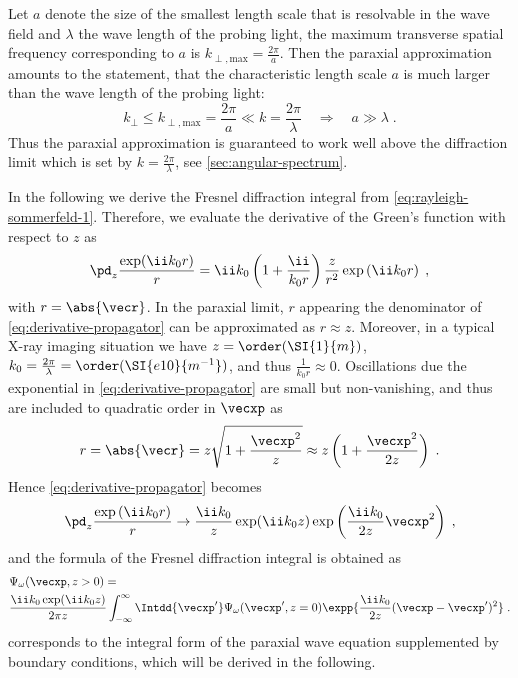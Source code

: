 \documentclass[
twoside,
openright,
titlepage,
numbers=noenddot,
headinclude,
fleqn,
a4paper,
footinclude=true,
cleardoublepage=empty,
abstractoff,
BCOR=5mm,
paper=a4,
fontsize=11pt,
british,ngerman,american,
]{scrreprt}
\begin{document}
Let $a$ denote the size of the smallest length scale that is
resolvable in the wave field and $\lambda$ the wave length of the
probing light, the maximum transverse spatial frequency corresponding
to $a$ is $k_{\perp,\mathrm{max}}=\frac{2\pi}{a}$.  Then the paraxial
approximation amounts to the statement, that the characteristic length
scale $a$ is much larger than the wave length of the probing light:
\begin{equation}
  k_{\perp} \le k_{\perp,\mathrm{max}} = \frac{2\pi}{a} \ll k = 
  \frac{2\pi}{\lambda}
  \quad\Rightarrow\quad a\gg\lambda\;.
\end{equation}
Thus the paraxial approximation is guaranteed to work well above the
diffraction limit which is set by $k=\frac{2\pi}{\lambda}$, see
\cref{sec:angular-spectrum}. %

In the following we derive the Fresnel diffraction integral from
\cref{eq:rayleigh-sommerfeld-1}.  Therefore, we evaluate the
derivative of the Green's function with respect to $z$ as
\begin{equation}
  \label{eq:derivative-propagator}
  \pd_z \frac{\exp(\ii k_0 r)}{r} 
  = \ii k_0\left(1+\frac{\ii}{k_0 r}\right)\frac{z}{r^2}
  \exp\left(\ii k_0 r\right) \;,
\end{equation}
with $r = \abs{\vecr}$.  In the paraxial limit, $r$ appearing the
denominator of \cref{eq:derivative-propagator} can be approximated as
$r\approx z$.  Moreover, in a typical X-ray imaging situation we have
$z = \order(\SI{1}{m})$,
$k_0=\frac{2\pi}{\lambda}=\order(\SI{e10}{m^{-1}})$, and thus
$\frac{1}{k_0 r}\approx 0$.  Oscillations due the exponential in
\cref{eq:derivative-propagator} are small but non-vanishing, and thus
are included to quadratic order in $\vecxp$ as
\begin{equation}
  \label{eq:spherical-parabolic-real}
  r=\abs{\vecr}=z\sqrt{1+\frac{\vecxp^2}{z}} 
  \approx z\left(1+\frac{\vecxp^2}{2z}\right) \;.
\end{equation}
 Hence \cref{eq:derivative-propagator} becomes
\begin{equation}
  \label{eq:fresnel-propagator-limit}
  \pd_z \frac{\exp\left(\ii k_0 r\right)}{r} \to
  \frac{\ii k_0}{z} \exp(\ii k_0 z) 
  \exp\left(\frac{\ii k_0}{2 z} \vecxp^2\right) \;,
\end{equation}
and the formula of the Fresnel diffraction integral is obtained as
\begin{equation}
  \label{eq:fresnel-restored}
  \begin{split}
  &\Psi_\omega(\vecxp,z>0) = 
  \\ & \frac{\ii k_0 \exp(\ii k_0 z)}{2\pi z}
  \int_{-\infty}^{\infty}\Intdd{\vecxp'}
  \Psi_\omega(\vecxp',z=0) 
  \expp{\frac{\ii k_0}{2 z}(\vecxp-\vecxp')^2} \;.
  \end{split}
\end{equation}
 corresponds to the integral form of the
paraxial wave equation supplemented by boundary conditions, which will
be derived in the following.
\end{document}
